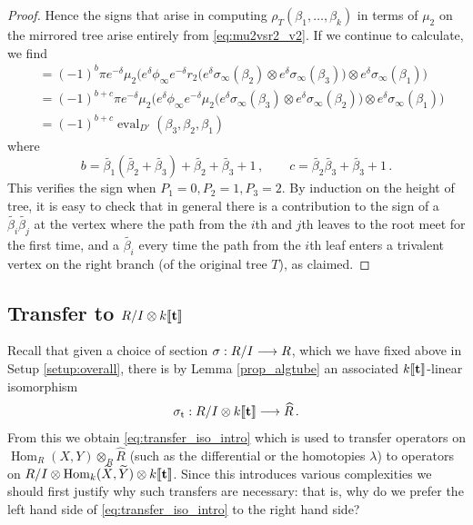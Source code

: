 \documentclass[english,letter paper,12pt,leqno]{article}
\theoremstyle{example}
\numberwithin{equation}{section}
\def\Hom{\operatorname{Hom}}
\DeclareMathOperator{\sigmastar}{\sigma_t}
\begin{document}
\begin{proof}
Hence the signs that arise in computing $\rho_T(\beta_1,\ldots,\beta_k)$ in terms of $\mu_2$ on the mirrored tree arise entirely from \eqref{eq:mu2vsr2_v2}. If we continue to calculate, we find
\begin{align*}
&= (-1)^{b} \pi e^{-\delta} \mu_2\Big( e^{\delta} \phi_\infty e^{-\delta} r_2\Big( e^{\delta} \sigma_\infty(\beta_2) \otimes e^{\delta} \sigma_\infty(\beta_3) \Big) \otimes e^{\delta}\sigma_\infty(\beta_1) \Big)\\
&= (-1)^{b + c} \pi e^{-\delta} \mu_2\Big( e^{\delta} \phi_\infty e^{-\delta} \mu_2\Big( e^{\delta} \sigma_\infty(\beta_3) \otimes e^{\delta} \sigma_\infty(\beta_2) \Big) \otimes e^{\delta}\sigma_\infty(\beta_1) \Big)\\
&= (-1)^{b + c} \operatorname{eval}_{D'}( \beta_3, \beta_2, \beta_1 )
\end{align*}
where
\[
b = \widetilde{\beta_1}( \widetilde{\beta_2} + \widetilde{\beta_3} ) + \widetilde{\beta_2} + \widetilde{\beta_3} + 1\,, \qquad c = \widetilde{\beta_2}\widetilde{\beta_3} + \widetilde{\beta_3} + 1\,.
\]
This verifies the sign when $P_1 = 0, P_2 = 1, P_3 = 2$. By induction on the height of tree, it is easy to check that in general there is a contribution to the sign of a $\widetilde{\beta_i}\widetilde{\beta_j}$ at the vertex where the path from the $i$th and $j$th leaves to the root meet for the first time, and a $\widetilde{\beta_i}$ every time the path from the $i$th leaf enters a trivalent vertex on the right branch (of the original tree $T$), as claimed.
\end{proof}

\subsection{Transfer to $R/I \otimes k\llbracket \bold{t} \rrbracket$}\label{section:transfer_to_ri}

Recall that given a choice of section $\sigma: R/I \longrightarrow R$, which we have fixed above in Setup \ref{setup:overall}, there is by Lemma \ref{prop_algtube} an associated $k\llbracket \bold{t} \rrbracket$-linear isomorphism
\[
\sigmastar: R/I \otimes k \llbracket \bold{t} \rrbracket \lto \widehat{R}\,.
\]
From this we obtain \eqref{eq:transfer_iso_intro} which is used to transfer operators on $\Hom_R(X,Y) \otimes_R \widehat{R}$ (such as the differential or the homotopies $\lambda$) to operators on $R/I \otimes \Hom_k(\widetilde{X}, \widetilde{Y}) \otimes k\llbracket \bold{t} \rrbracket$. Since this introduces various complexities we should first justify why such transfers are necessary: that is, why do we prefer the left hand side of \eqref{eq:transfer_iso_intro} to the right hand side?
\end{document}
